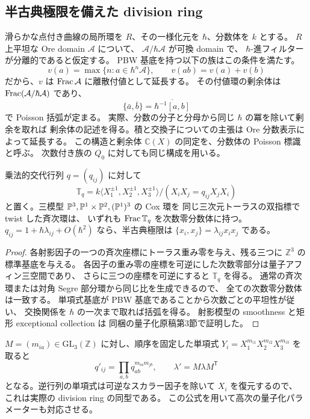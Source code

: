 \subsection{半古典極限を備えた division ring}

滑らかな点付き曲線の局所環を $R$、その一様化元を $\hbar$、分数体を $k$ とする。
$R$ 上平坦な Ore domain $\mathcal A$ について、
$\mathcal A/\hbar\mathcal A$ が可換 domain で、
$\hbar$-進フィルターが分離的であると仮定する。
PBW 基底を持つ以下の族はこの条件を満たす。
\[
 v(a)=\max\{n:a\in\hbar^n\mathcal A\},\qquad
 v(ab)=v(a)+v(b)
\]
だから、$v$ は $\operatorname{Frac}\mathcal A$ に離散付値として延長する。
その付値環の剰余体は $\operatorname{Frac}(\mathcal A/\hbar\mathcal A)$ であり、
\[
 \{\bar a,\bar b\}=\overline{\hbar^{-1}[a,b]}
\]
で Poisson 括弧が定まる。
実際、分数の分子と分母から同じ $\hbar$ の冪を除いて剰余を取れば
剰余体の記述を得る。積と交換子についての主張は Ore 分数表示によって延長する。
この構造と剰余体 $\mathbb C(X)$ の同定を、分数体の Poisson 標識と呼ぶ。
次数付き族の $Q_0$ に対しても同じ構成を用いる。

\begin{proposition}\label{prop:toric-common-field}
乗法的交代行列 $q=(q_{ij})$ に対して
\[
 \mathbb T_q=k\langle X_1^{\pm1},X_2^{\pm1},X_3^{\pm1}\rangle/
 (X_iX_j=q_{ij}X_jX_i)
\]
と置く。三模型 $\mathbb P^3,\mathbb P^1\times\mathbb P^2,(\mathbb P^1)^3$ の Cox 環を
同じ三次元トーラスの双指標で twist した斉次環は、
いずれも $\operatorname{Frac}\mathbb T_q$ を次数零分数体に持つ。
$q_{ij}=1+\hbar\lambda_{ij}+O(\hbar^2)$ なら、半古典極限は
$\{x_i,x_j\}=\lambda_{ij}x_ix_j$ である。
\end{proposition}
\begin{proof}
各射影因子の一つの斉次座標にトーラス重み零を与え、残る三つに
$\mathbb Z^3$ の標準基底を与える。
各因子の重み零の座標を可逆にした次数零部分は量子アフィン三空間であり、
さらに三つの座標を可逆にすると $\mathbb T_q$ を得る。
通常の斉次環または対角 Segre 部分環から同じ比を生成できるので、
全ての次数零分数体は一致する。
単項式基底が PBW 基底であることから次数ごとの平坦性が従い、
交換関係を $\hbar$ の一次まで取れば括弧を得る。
射影模型の smoothness と矩形 exceptional collection は
同梱の量子化原稿第3節で証明した。
\end{proof}

$M=(m_{ia})\in\mathrm{GL}_3(\mathbb Z)$ に対し、順序を固定した単項式
$Y_i=X_1^{m_{i1}}X_2^{m_{i2}}X_3^{m_{i3}}$ を取ると
\[
 q'_{ij}=\prod_{a,b}q_{ab}^{m_{ia}m_{jb}},\qquad
 \lambda'=M\lambda M^{\mathsf T}
\]
となる。逆行列の単項式は可逆なスカラー因子を除いて $X_i$ を復元するので、
これは実際の division ring の同型である。
この公式を用いて高次の量子化パラメーターも対応させる。

